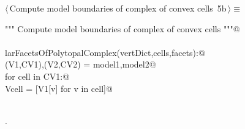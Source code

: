 \documentclass[11pt,oneside]{article}	%
\begin{document}
\begin{flushleft} \small \label{scrap2}
\protect{}$\langle\,$Compute model boundaries of complex of convex cells\nobreak\ {\footnotesize 5b}$\,\rangle\equiv$
\vspace{-1ex}
\begin{list}{}{} \item
\mbox{}\verb@""" Compute model boundaries of complex of convex cells """@\\
\mbox{}\verb@@\\
\mbox{}\verb@def larFacetsOfPolytopalComplex(vertDict,cells,facets):@\\
\mbox{}\verb@   (V1,CV1),(V2,CV2) = model1,model2@\\
\mbox{}\verb@   for cell in CV1:@\\
\mbox{}\verb@      Vcell = [V1[v] for v in cell]@\\
\mbox{}\verb@@\\
\mbox{}\verb@@{\NWsep}
\end{list}
\vspace{-1ex}
\footnotesize\addtolength{\baselineskip}{-1ex}
\begin{list}{}{\setlength{\itemsep}{-\parsep}\setlength{\itemindent}{-\leftmargin}}
\item {\NWtxtMacroNoRef}.
\end{list}
\end{flushleft}
\end{document}
